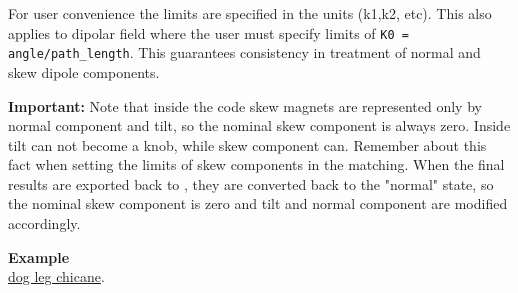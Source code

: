 For user convenience the limits are specified in the \madx units (k1,k2,
etc). This also applies to dipolar field where the user must specify
limits of \texttt{K0 = angle/path\_length}. This guarantees consistency in
treatment of normal and skew dipole components.

\textbf{Important:} Note that inside the code skew magnets are represented
only by normal component and tilt, so the nominal skew component is
always zero.  Inside \ptc tilt can not become a knob, while skew
component can.  Remember about this fact when setting the limits of skew
components in the matching.  When the final results are exported back to
\madx, they are converted back to the "normal" state, so the nominal
skew component is zero and tilt and normal component are modified
accordingly.

\textbf{Example}\\
\href{http://cern.ch/frs/mad-X_examples/ptc_madx_interface/matchknobs/.madx}{dog leg chicane}.

